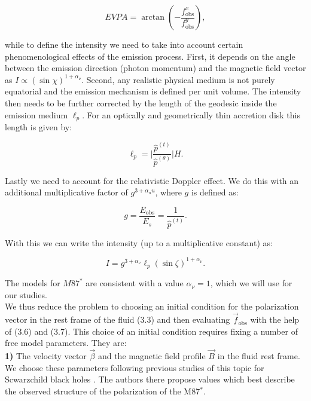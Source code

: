 \documentclass[12pt]{article}
\numberwithin{equation}{section}
\numberwithin{figure}{section}
\begin{document}
	\begin{equation}
		EVPA = \arctan\left(-\frac{f^x_\text{obs}}{f^y_\text{obs}}\right),
	\end{equation}
	
	\noindent while to define the intensity we need to take into account certain phenomenological effects of the emission process. First, it depends on the angle between the emission direction (photon momentum) and the magnetic field vector as $I\propto \left(\sin\chi\right)^{1+\alpha_\nu}$. Second, any realistic physical medium is not purely equatorial and the emission mechanism is defined per unit volume. The intensity then needs to be further corrected by the length of the geodesic inside the emission medium $\ell_p$. For an optically and geometrically thin accretion disk this length is given by:
	
	\begin{equation}
		\ell_p = \bigg\vert\frac{\hat{p}^{(t)}}{\hat{p}^{(\theta)}}\bigg\vert H.
	\end{equation}
	
	\noindent Lastly we need to account for the relativistic Doppler effect. We do this with an additional multiplicative factor of $g^{3 + \alpha_nu}$, where $g$ is defined as:
	
	\begin{equation}
		g = \frac{E_\text{obs}}{E_s} = \frac{1}{\hat{p}^{(t)}}.
	\end{equation}
	
	\noindent With this we can write the intensity (up to a multiplicative constant) as:
	
	\begin{equation}
		I = g^{3 + \alpha_\nu}\ell_p(\sin\zeta)^{1 + \alpha_\nu}.
	\end{equation}
	
	\noindent The models for $M87^*$ are consistent with a value $\alpha_\nu = 1$, which we will use for our studies.\\
	
	We thus reduce the problem to choosing an initial condition for the polarization vector in the rest frame of the fluid (3.3) and then evaluating $\vec{f}_\text{obs}$ with the help of (3.6) and (3.7). This choice of an initial condition requires fixing a number of free model parameters. They are:\\
	
	\textbf{1)} The velocity vector $\vec{\beta}$ and the magnetic field profile $\vec{B}$ in the fluid rest frame. We choose these parameters following previous studies of this topic for Scwarzchild black holes \cite{Narayan2021}. The authors there propose values which best describe the observed structure of the polarization of the M87$^*$.\\
	
\end{document}
